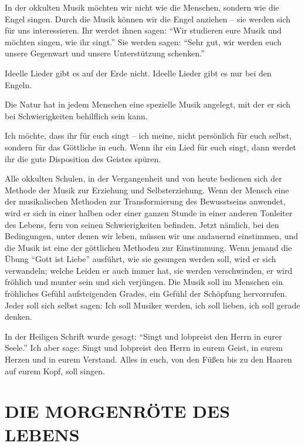 \documentclass[11pt,a5paper,twoside]{article}
\begin{document}
In der okkulten Musik möchten wir nicht wie die Menschen, sondern wie die Engel singen. Durch die Musik können wir die Engel anziehen – sie werden sich für uns interessieren. Ihr werdet ihnen sagen: "`Wir studieren eure Musik und möchten singen, wie ihr singt."' Sie werden sagen: "`Sehr gut, wir werden euch unsere Gegenwart und unsere Unterstützung schenken."'

Ideelle Lieder gibt es auf der Erde nicht. Ideelle Lieder gibt es nur bei den Engeln.

Die Natur hat in jedem Menschen eine spezielle Musik angelegt, mit der er sich bei Schwierigkeiten behilflich sein kann. 

Ich möchte, dass ihr für euch singt – ich meine, nicht persönlich für euch selbst, sondern für das Göttliche in euch. Wenn ihr ein Lied für euch singt, dann werdet ihr die gute Disposition des Geistes spüren.

Alle okkulten Schulen, in der Vergangenheit und von heute bedienen sich der Methode der Musik zur Erziehung und Selbsterziehung. Wenn der Mensch eine der musikalischen Methoden zur Transformierung des Bewusstseins anwendet, wird er sich in einer halben oder einer ganzen Stunde in einer anderen Tonleiter des Lebens, fern von seinen Schwierigkeiten befinden. Jetzt nämlich, bei den Bedingungen, unter denen wir leben, müssen wir uns andauernd einstimmen, und die Musik ist eine der göttlichen Methoden zur Einstimmung. Wenn jemand die Übung "`Gott ist Liebe"' ausführt, wie sie gesungen werden soll, wird er sich verwandeln; welche Leiden er auch immer hat, sie werden verschwinden, er wird fröhlich und munter sein und sich verjüngen.
Die Musik soll im Menschen ein fröhliches Gefühl aufsteigenden Grades, ein Gefühl der Schöpfung hervorrufen. Jeder soll sich selbst sagen: Ich soll Musiker werden, ich soll lieben, ich soll gerade denken. 

In der Heiligen Schrift wurde gesagt: "`Singt und lobpreist den Herrn in eurer Seele."' Ich aber sage: Singt und lobpreist den Herrn in eurem Geist, in eurem Herzen und in eurem Verstand. Alles in euch, von den Füßen bis zu den Haaren auf eurem Kopf, soll singen.  







\newpage




\section[Die Morgenröte des Lebens]{DIE MORGENRÖTE DES LEBENS}
\end{document}
